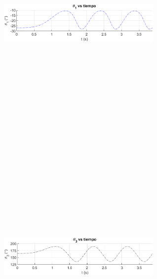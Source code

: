 \documentclass[12pt]{article}
\begin{document}
\begin{multicols}{2}
\begin{figure} [H]
    \end{figure}
        \vspace{-20pt}
        \begin{figure} [H]
        \centerline{\includegraphics[width=8cm, height=12cm,keepaspectratio]{simulacion/theta1.png}}
    \end{figure}
        \vspace{-20pt}
        \begin{figure} [H]
        \centerline{\includegraphics[width=8cm, height=12cm,keepaspectratio]{simulacion/theta3.png}}

\end{figure}
\end{multicols}
\end{document}
